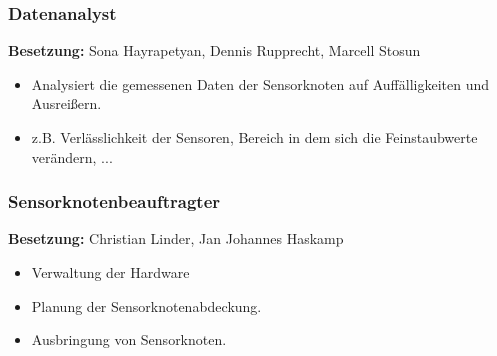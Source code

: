 \subsubsection{Datenanalyst}
\textbf{Besetzung:}  Sona Hayrapetyan, Dennis Rupprecht, Marcell Stosun \\
\begin{itemize}
	\item Analysiert die gemessenen Daten der Sensorknoten auf Auffälligkeiten und Ausreißern. 
	\item z.B. Verlässlichkeit der Sensoren, Bereich in dem sich die Feinstaubwerte verändern, ...
\end{itemize}

\subsubsection{Sensorknotenbeauftragter}
\textbf{Besetzung:}  Christian Linder, Jan Johannes Haskamp\\
\begin{itemize}
	\item Verwaltung der Hardware
	\item Planung der Sensorknotenabdeckung.
	\item Ausbringung von Sensorknoten.
\end{itemize}